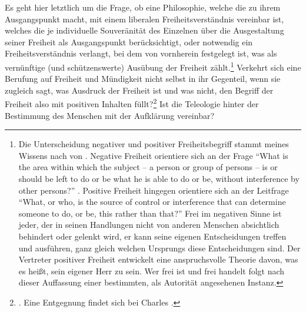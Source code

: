 \label{Abschnitt:TwoConceptsofLiberty}
Es geht hier letztlich um die Frage, ob eine Philosophie, welche die
 zu ihrem Ausgangspunkt macht, mit einem
liberalen Freiheitsverständnis vereinbar ist,
welches die je individuelle Souveränität des Einzelnen über die Ausgestaltung
seiner Freiheit als Ausgangspunkt berücksichtigt, oder notwendig ein
 Freiheitsverständnis verlangt, bei dem von vornherein
festgelegt ist, was als vernünftige (und schützenswerte) Ausübung der Freiheit
zählt.\footnote{Die Unterscheidung negativer und positiver Freiheitsbegriff
stammt meines Wissens nach von
. Negative Freiheit
orientiere sich an der Frage \enquote{What is the area within which the subject
-- a person or group of persons -- is or should be left to do or be what he is able to do or
be, without interference by other persons?}
\parencite[][194]{Berlin:TheProperStudyofMankind1997}. Positive Freiheit
hingegen orientiere sich an der Leitfrage \enquote{What, or who, is the source
of control or interference that can determine someone to do, or be, this
rather than that?} \parencite[][194]{Berlin:TheProperStudyofMankind1997} Frei im
negativen Sinne ist jeder, der in seinen Handlungen nicht von anderen Menschen
absichtlich behindert oder gelenkt wird, er kann seine eigenen Entscheidungen
treffen und ausführen, ganz gleich welchen Ursprungs diese Entscheidungen sind.
Der Vertreter positiver Freiheit  entwickelt eine anspruchsvolle Theorie davon,
was es heißt, sein eigener Herr zu sein. Wer frei ist und frei handelt folgt
nach dieser Auffassung einer bestimmten, als Autorität angesehenen Instanz.}
Verkehrt sich eine Berufung auf Freiheit und Mündigkeit nicht selbst in ihr
Gegenteil, wenn sie zugleich sagt, was Ausdruck der Freiheit ist und was nicht,
den Begriff der Freiheit also mit positiven Inhalten
füllt?\footnote{\cite[Vgl.][191-242]{Berlin:TheProperStudyofMankind1997}. Eine
Entgegnung findet sich bei Charles
\textcite[vgl.][]{Taylor:WhatsWrongWithNegativeLiberty2005}.} Ist die Teleologie
hinter der Bestimmung des Menschen mit der Aufklärung vereinbar?
\begin{comment}
Wir
sollten genau hinschauen, wenn \name[Immanuel]{Kant} glaubt, eine Natur
oder gar Bestimmung des Menschen aufweisen zu können. Möglicherweise handelt es
sich bloß um halbherzige Säkularisierungen religiöser Dogmen, die eine auf
Freiheit ausgerichtete Aufklärung besser ganz eliminieren sollte. Sobald man aber
versucht, von teleologischen Momenten innerhalb der Anthropologie abzusehen,
erhält man eine (veraltete) Etappe in der Entwicklung der empirischen
Psychologie, die von der Anknüpfung an die Bestimmung des Menschen entlastet
ist, damit aber auch ihre Relevanz für die Aufklärungsphilosophie
verliert.\end{comment}

